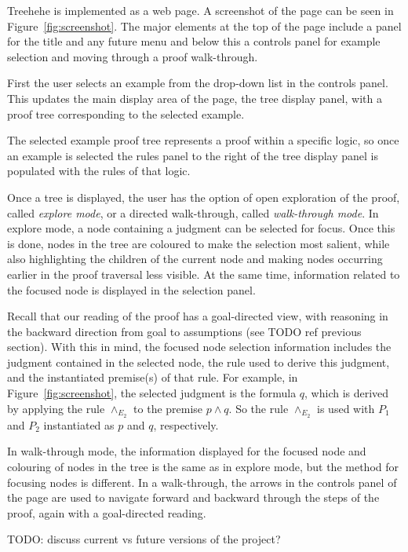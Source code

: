 \documentclass[conference]{IEEEtran}
\newcommand{\projectname}{Treehehe}
\begin{document}
\projectname{} is implemented as a web page. A screenshot of the page can be seen in Figure~\ref{fig:screenshot}. The major elements at the top of the page include a panel for the title and any future menu and below this a controls panel for example selection and moving through a proof walk-through.

First the user selects an example from the drop-down list in the controls panel. This updates the main display area of the page, the tree display panel, with a proof tree corresponding to the selected example.

The selected example proof tree represents a proof within a specific logic, so once an example is selected the rules panel to the right of the tree display panel is populated with the rules of that logic.

Once a tree is displayed, the user has the option of open exploration of the proof, called \textit{explore mode}, or a directed walk-through, called \textit{walk-through mode}. In explore mode, a node containing a judgment can be selected for focus. Once this is done, nodes in the tree are coloured to make the selection most salient, while also highlighting the children of the current node and making nodes occurring earlier in the proof traversal less visible. At the same time, information related to the focused node is displayed in the selection panel.

Recall that our reading of the proof has a goal-directed view, with reasoning in the backward direction from goal to assumptions (see TODO ref previous section). With this in mind, the focused node selection information includes the judgment contained in the selected node, the rule used to derive this judgment, and the instantiated premise(s) of that rule. For example, in Figure~\ref{fig:screenshot}, the selected judgment is the formula $q$, which is derived by applying the rule $\wedge_{E_2}$ to the premise $p \wedge q$. So the rule $\wedge_{E_2}$ is used with $P_1$ and $P_2$ instantiated as $p$ and $q$, respectively.

In walk-through mode, the information displayed for the focused node and colouring of nodes in the tree is the same as in explore mode, but the method for focusing nodes is different. In a walk-through, the arrows in the controls panel of the page are used to navigate forward and backward through the steps of the proof, again with a goal-directed reading.

TODO: discuss current vs future versions of the project? \\
\end{document}

